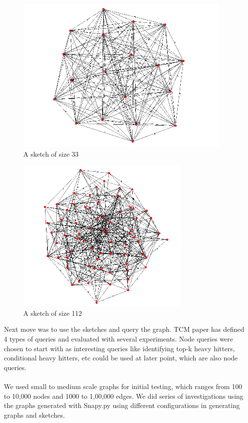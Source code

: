 \documentclass[12pt]{report}
\numberwithin{figure}{section}
\numberwithin{table}{section}
\begin{document}
\begin{figure}[H]
\centering
\includegraphics[scale=0.8]{images/s2}
\caption{A sketch of size 33}
\end{figure}

 

\begin{figure}[H]
\centering
\includegraphics[scale=0.8]{images/s3}
\caption{A sketch of size 112}
\end{figure}

Next move was to use the sketches and query the graph. TCM paper has defined 4 types of queries and evaluated with several experiments. Node queries were chosen to start with as interesting queries like identifying top-k heavy hitters\cite{HeavyHitters}, conditional heavy hitters\cite{TCM}, etc could be used at later point, which are also node queries. 

\paragraph{}

We used small to medium scale graphs for initial testing, which ranges from 100 to 10,000 nodes and 1000 to 1,00,000 edges.  We did series of investigations using the graphs generated with Snapy.py using different configurations in generating graphs and sketches.
\end{document}
